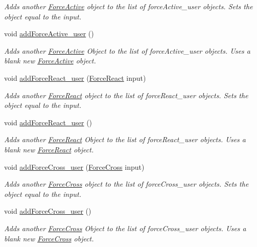 \begin{DoxyCompactItemize}
\begin{DoxyCompactList}\small\item\em Adds another \hyperlink{class_force_active}{Force\-Active} object to the list of force\-Active\-\_\-user objects. Sets the object equal to the input. \end{DoxyCompactList}\item 
void \hyperlink{class_system_ad6cb91afdaca6870cafda01933fa85ea}{add\-Force\-Active\-\_\-user} ()
\begin{DoxyCompactList}\small\item\em Adds another \hyperlink{class_force_active}{Force\-Active} Object to the list of force\-Active\-\_\-user objects. Uses a blank new \hyperlink{class_force_active}{Force\-Active} object. \end{DoxyCompactList}\item 
void \hyperlink{class_system_aa51930622fa8340b03e6905b23358982}{add\-Force\-React\-\_\-user} (\hyperlink{class_force_react}{Force\-React} input)
\begin{DoxyCompactList}\small\item\em Adds another \hyperlink{class_force_react}{Force\-React} object to the list of force\-React\-\_\-user objects. Sets the object equal to the input. \end{DoxyCompactList}\item 
void \hyperlink{class_system_aef2d7a3af23839f8c104058f2e4e11e2}{add\-Force\-React\-\_\-user} ()
\begin{DoxyCompactList}\small\item\em Adds another \hyperlink{class_force_react}{Force\-React} Object to the list of force\-React\-\_\-user objects. Uses a blank new \hyperlink{class_force_react}{Force\-React} object. \end{DoxyCompactList}\item 
void \hyperlink{class_system_afa58e77f961286c082e18193aeb14fc7}{add\-Force\-Cross\-\_\-user} (\hyperlink{class_force_cross}{Force\-Cross} input)
\begin{DoxyCompactList}\small\item\em Adds another \hyperlink{class_force_cross}{Force\-Cross} object to the list of force\-Cross\-\_\-user objects. Sets the object equal to the input. \end{DoxyCompactList}\item 
void \hyperlink{class_system_abc3ad01f3fb22863565a8643202347f4}{add\-Force\-Cross\-\_\-user} ()
\begin{DoxyCompactList}\small\item\em Adds another \hyperlink{class_force_cross}{Force\-Cross} Object to the list of force\-Cross\-\_\-user objects. Uses a blank new \hyperlink{class_force_cross}{Force\-Cross} object. \end{DoxyCompactList}\item 

\end{DoxyCompactItemize}
